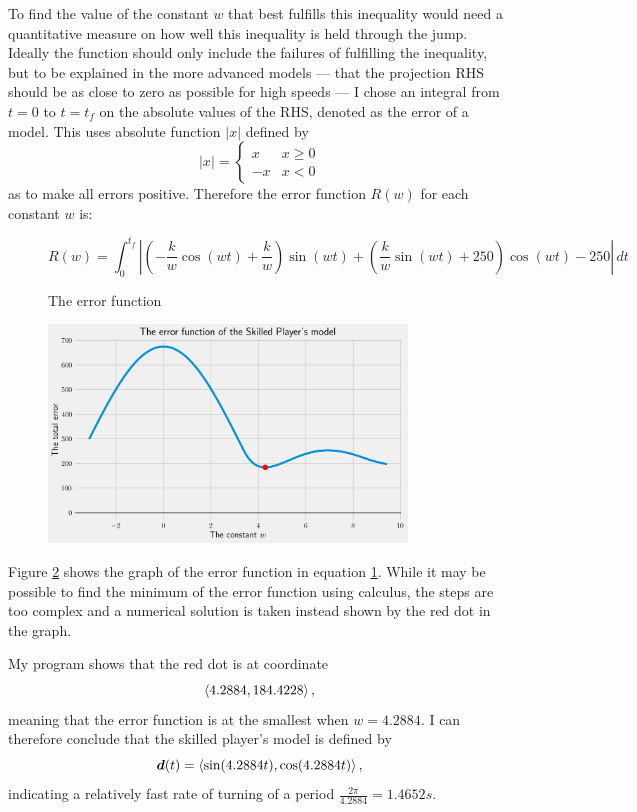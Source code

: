 To find the value of the constant $w$ that best fulfills this inequality would need a quantitative measure on how well this inequality is held through the jump. Ideally the function should only include the failures of fulfilling the inequality, but to be explained in the more advanced models --- that the projection RHS should be as close to zero as possible for high speeds --- I chose an integral from $t=0$ to $t=t_f$ on the absolute values of the RHS, denoted as the error of a model. This uses absolute function $|x|$ defined by
\[
 |x| = \begin{cases}
         x & x \geq 0\\
         -x & x < 0
        \end{cases}
\]
as to make all errors positive. Therefore the error function $R(w)$ for each constant $w$ is:
\begin{figure}[H]
 \centering
 \[
  R(w) = \int_0^{t_f} \left|\left(-\frac{k}{w} \cos(wt) + \frac{k}{w}\right) \sin(wt) + \left(\frac{k}{w} \sin(wt) + 250\right) \cos(wt) - 250\right| \, dt
 \]
 \caption{The error function}
 \label{eq:2error}
\end{figure}


\begin{figure}[H]
 \centering
 \includegraphics[width=0.85\textwidth]{assets/restriction_equation.png}
 \caption{}
 \label{fig:2error}
\end{figure}
Figure \ref{fig:2error} shows the graph of the error function in equation \ref{eq:2error}. While it may be possible to find the minimum of the error function using calculus, the steps are too complex and a numerical solution is taken instead shown by the red dot in the graph.

My program shows that the red dot is at coordinate
\[
    \left\langle 4.2884, 184.4228 \right\rangle,
\]
meaning that the error function is at the smallest when $w=4.2884$. I can therefore conclude that the skilled player's model is defined by
\[
    \boldsymbol{d}(t) = \left\langle \sin(4.2884t), \cos(4.2884t) \right\rangle,
\]
indicating a relatively fast rate of turning of a period $\frac{2\pi}{4.2884} = 1.4652\si{s}$.

